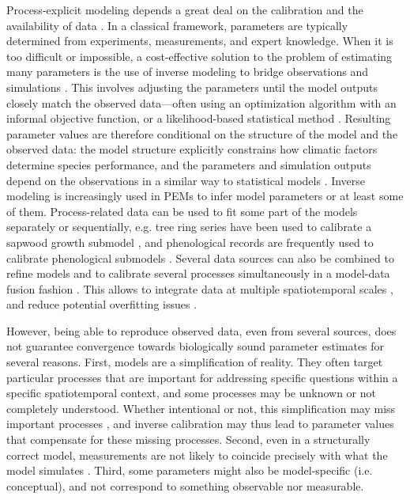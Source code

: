 \documentclass[preprint,12pt,authoryear]{elsarticle}
\begin{document}
Process-explicit modeling depends a great deal on the calibration and the availability of data \citep{Cabral2017}. In a classical framework, parameters are typically determined from experiments, measurements, and expert knowledge. When it is too difficult or impossible, a cost-effective solution to the problem of estimating many parameters is the use of inverse modeling to bridge observations and simulations \citep{Evans2016}. This involves adjusting the parameters until the model outputs closely match the observed data---often using an optimization algorithm with an informal objective function, or a likelihood-based statistical method \citep{Malchow2024}. Resulting parameter values are therefore conditional on the structure of the model  and the observed data: the model structure explicitly constrains how climatic factors determine species performance, and the parameters and simulation outputs depend on the observations in a similar way to statistical models \citep{Zhang2024}. Inverse modeling is increasingly used in PEMs to infer model parameters or at least some of them. Process-related data can be used to fit some part of the models separately or sequentially, e.g. tree ring series have been used to calibrate a sapwood growth submodel \citep{DeCaceres2023}, and phenological records are frequently used to calibrate phenological submodels \citep{Chuine2013}. Several data sources can also be combined to refine models \citep{BenitoGarzon2019} and to calibrate several processes simultaneously in a model-data fusion fashion \citep[e.g.][]{Trotsiuk2020}. This allows to integrate data at multiple spatiotemporal scales \citep{Hartig2012, Niu2014}, and reduce potential overfitting issues \citep{Bacour2023}.

However, being able to reproduce observed data, even from several sources, does not guarantee convergence towards biologically sound parameter estimates for several reasons. First, models are a simplification of reality. They often target particular processes that are important for addressing specific questions within a specific spatiotemporal context, and some processes may be unknown or not completely understood. Whether intentional or not, this simplification may miss important processes \citep{Forrester2021}, and inverse calibration may thus lead to parameter values that compensate for these missing processes. Second, even in a structurally correct model, measurements are not likely to coincide precisely with what the model simulates \citep{Zhang2024}. Third, some parameters might also be model-specific (i.e. conceptual), and not correspond to something observable nor measurable.
\end{document}
